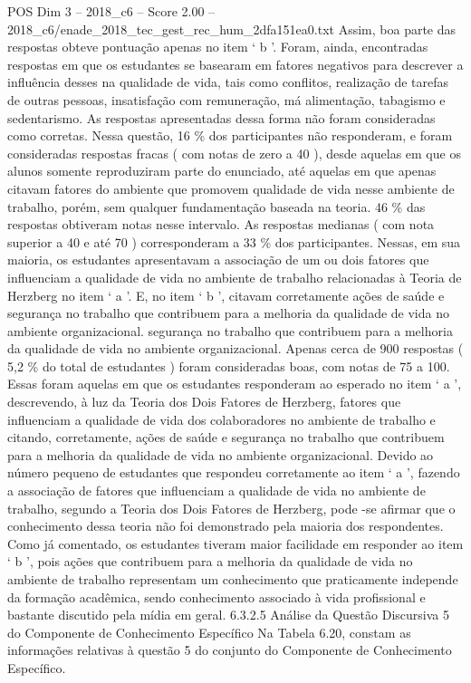 \begin{textsample}{POS Dim 3 – 2018\_c6 – Score 2.00 – 2018\_c6/enade\_2018\_tec\_gest\_rec\_hum\_2dfa151ea0.txt}
Assim, boa parte das respostas obteve pontuação apenas no item ‘ b ’.
Foram, ainda, encontradas respostas em que os estudantes se basearam em fatores negativos para descrever a influência desses na qualidade de vida, tais como conflitos, realização de tarefas de outras pessoas, insatisfação com remuneração, má alimentação, tabagismo e sedentarismo.
As respostas apresentadas dessa forma não foram consideradas como corretas.
Nessa questão, 16 \% dos participantes não responderam, e foram consideradas respostas fracas ( com notas de zero a 40 ), desde aquelas em que os alunos somente reproduziram parte do enunciado, até aquelas em que apenas citavam fatores do ambiente que promovem qualidade de vida nesse ambiente de trabalho, porém, sem qualquer fundamentação baseada na teoria. 46 \% das respostas obtiveram notas nesse intervalo.
As respostas medianas ( com nota superior a 40 e até 70 ) corresponderam a 33 \% dos participantes.
Nessas, em sua maioria, os estudantes apresentavam a associação de um ou dois fatores que influenciam a qualidade de vida no ambiente de trabalho relacionadas à Teoria de Herzberg no item ‘ a ’.
E, no item ‘ b ’, citavam corretamente ações de saúde e segurança no trabalho que contribuem para a melhoria da qualidade de vida no ambiente organizacional. segurança no trabalho que contribuem para a melhoria da qualidade de vida no ambiente organizacional.
Apenas cerca de 900 respostas ( 5,2 \% do total de estudantes ) foram consideradas boas, com notas de 75 a 100.
Essas foram aquelas em que os estudantes responderam ao esperado no item ‘ a ’, descrevendo, à luz da Teoria dos Dois Fatores de Herzberg, fatores que influenciam a qualidade de vida dos colaboradores no ambiente de trabalho e citando, corretamente, ações de saúde e segurança no trabalho que contribuem para a melhoria da qualidade de vida no ambiente organizacional.
Devido ao número pequeno de estudantes que respondeu corretamente ao item ‘ a ’, fazendo a associação de fatores que influenciam a qualidade de vida no ambiente de trabalho, segundo a Teoria dos Dois Fatores de Herzberg, pode -se afirmar que o conhecimento dessa teoria não foi demonstrado pela maioria dos respondentes.
Como já comentado, os estudantes tiveram maior facilidade em responder ao item ‘ b ’, pois ações que contribuem para a melhoria da qualidade de vida no ambiente de trabalho representam um conhecimento que praticamente independe da formação acadêmica, sendo conhecimento associado à vida profissional e bastante discutido pela mídia em geral. 6.3.2.5 Análise da Questão Discursiva 5 do Componente de Conhecimento Específico Na Tabela 6.20, constam as informações relativas à questão 5 do conjunto do Componente de Conhecimento Específico.

\end{textsample}
